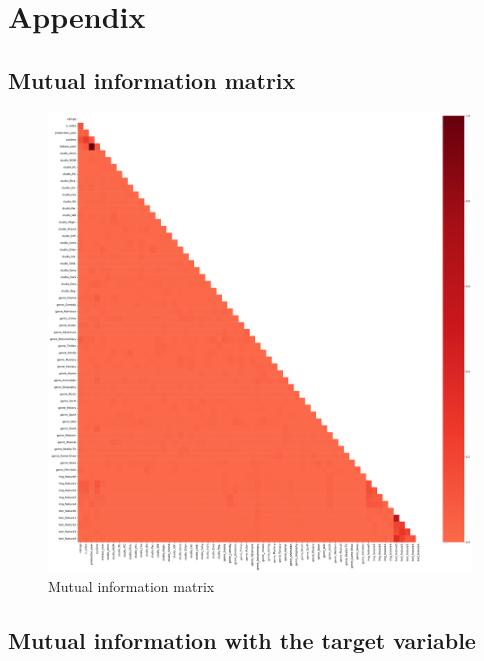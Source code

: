 \section*{Appendix}

\subsection*{Mutual information matrix}

\begin{figure}[H]
	\centering
	\includegraphics{figures/mi_matrix.pdf}
	\caption{Mutual information matrix}
	\label{fig:mi_matrix}
\end{figure}

\subsection*{Mutual information with the target variable}

